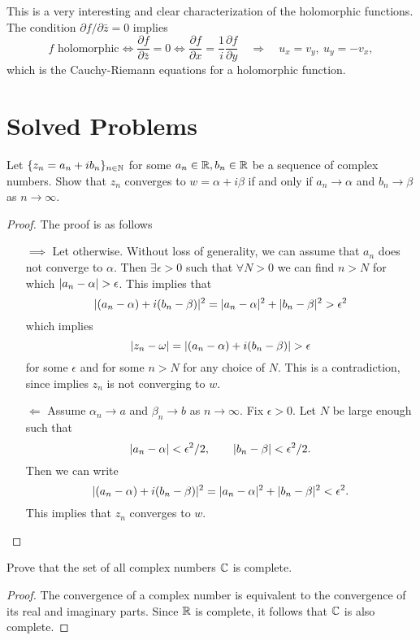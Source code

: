 This is a very interesting and clear characterization of the holomorphic functions. The condition $ \partial f/\partial \bar{z} = 0 $ implies 
\[ \boxed{f \text{ holomorphic}} \Longleftrightarrow \boxed{\frac{\partial f}{\partial \bar{z}} = 0} \Longleftrightarrow \boxed{\frac{\partial f}{\partial x} = \frac{1}{i}\frac{\partial f}{\partial y}} \quad \Longrightarrow \quad \boxed{u_x = v_y,\ u_y = -v_x}, \]
which is the Cauchy-Riemann equations for a holomorphic function.


\newpage

\section{Solved Problems}

\begin{problem}
	Let $ \{z_n = a_n + i b_n\}_{n\in\mathbb{N}} $ for some $ a_n \in \mathbb{R}, b_n \in \mathbb{R} $  be a sequence of complex numbers. Show that $ z_n $ converges to $ w = \alpha + i\beta $ if and only if $ a_n \to \alpha $ and $ b_n \to \beta $ as $ n\to \infty $.
\end{problem}

\begin{proof}
	The proof is as follows
	\begin{itemize}
		\item[$\boxed{ \implies }$] Let otherwise. Without loss of generality, we can assume that $ a_n $ does not converge to $ \alpha $. Then $ \exists \epsilon>0 $ such that $ \forall N>0 $ we can find $ n>N $ for which $ |a_n - \alpha| > \epsilon $. This implies that
		\[ |(a_n - \alpha) + i(b_n - \beta)|^2 = |a_n-\alpha|^2 + |b_n - \beta|^2  > \epsilon^2 \]
		which implies
		\[ |z_n - \omega|=|(a_n - \alpha) + i(b_n - \beta)| > \epsilon \]
		for some $ \epsilon $ and for some $ n>N $ for any choice of $ N $. This is a contradiction, since implies $ z_n $ is not converging to $ w $.
		\item[$ \boxed{\Longleftarrow} $] Assume $ \alpha_n \to a $ and $ \beta_n \to b $ as $ n\to \infty $. Fix $ \epsilon>0 $. Let $ N $ be large enough such that 
		\[ |a_n - \alpha|< \epsilon^2/2, \qquad |b_n - \beta|< \epsilon^2/2. \]
		Then we can write
		\[ |(a_n-\alpha) + i(b_n - \beta)|^2 = |a_n-\alpha|^2 + |b_n - \beta|^2 < \epsilon^2. \]
		This implies that $ z_n $ converges to $ w $.
	\end{itemize}
\end{proof}

\begin{problem}[Completeness of $ \C $]
	Prove that the set of all complex numbers $ \C $ is complete.
\end{problem}
\begin{proof}
	The convergence of a complex number is equivalent to the convergence of its real and imaginary parts. Since $ \mathbb{R} $ is complete, it follows that $ \C $ is also complete.
\end{proof}